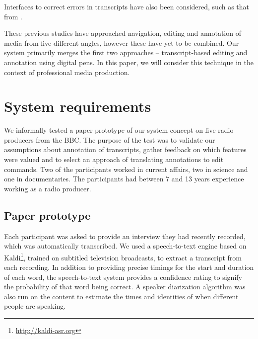 Interfaces to correct errors in transcripts have also been considered, such as that from \citet{Suhm2001}.

These previous studies have approached navigation, editing and annotation of media from five different angles, however
these have yet to be combined.  Our system primarily merges the first two approaches -- transcript-based editing and
annotation using digital pens. In this paper, we will consider this technique in the context of professional media
production.

\section{System requirements}\label{sec:paper-requirements}




We informally tested a paper prototype of our system concept on five radio producers from the BBC. The purpose of the
test was to validate our assumptions about annotation of transcripts, gather feedback on which features were valued and
to select an approach of translating annotations to edit commands.  Two of the participants worked in current affairs,
two in science and one in documentaries. The participants had between 7 and 13 years experience working as a radio
producer.

\subsection{Paper prototype}
Each participant was asked to provide an interview they had recently recorded, which was automatically transcribed.  We
used a speech-to-text engine based on Kaldi\footnote{\url{http://kaldi-asr.org}}, trained on subtitled television
broadcasts, to extract a transcript from each recording. In addition to providing precise timings for the start and
duration of each word, the speech-to-text system provides a confidence rating to signify the probability of that word
being correct. A speaker diarization \citep{AngueraMiro2012} algorithm was also run on the content to estimate the
times and identities of when different people are speaking.

